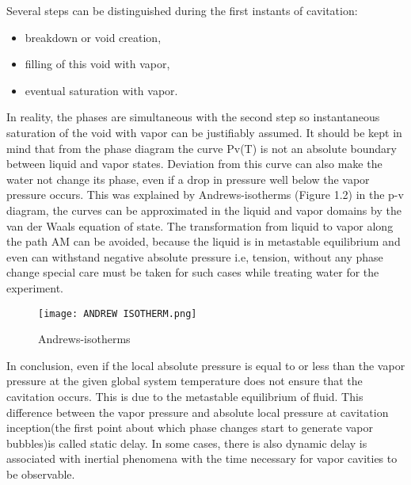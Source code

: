  
  Several steps can be distinguished during the first instants of cavitation:
  \begin{itemize}
  \item breakdown or void creation,
  \item filling of this void with vapor,
  \item eventual saturation with vapor.
  \end {itemize}
  In reality, the phases are simultaneous with the second step so instantaneous saturation of the void with vapor can be justifiably assumed. It should be kept in mind that from the phase diagram the curve Pv(T)
  is not an absolute boundary between liquid and vapor states. Deviation from this curve can also make the water not change its phase, even if a drop in pressure well below the vapor pressure occurs. This was explained by Andrews-isotherms (Figure 1.2) in the p-v diagram,
the curves can be approximated in the liquid and vapor domains by the van der Waals equation of state. The transformation from liquid to vapor along the path AM can be avoided, because the liquid is in
metastable equilibrium and even can withstand negative absolute pressure i.e, tension, without any phase change special care must be taken for such cases while treating water for the experiment.\\
  
 
\begin{figure}[H]
    \centering
    \texttt{[image: ANDREW ISOTHERM.png]}
    \caption{Andrews-isotherms}
    \label{fig:fig2}
\end{figure}
In conclusion, even if the local absolute pressure is equal to or less than the vapor pressure at the given global system temperature does not ensure that the cavitation occurs. This is due to the metastable equilibrium of fluid. This difference between the
vapor pressure and absolute local pressure at cavitation inception(the first point about which phase changes start to generate vapor bubbles)is called static delay. In some cases, there is also dynamic delay is 
associated with inertial phenomena with the time necessary for vapor cavities to be observable.\\
